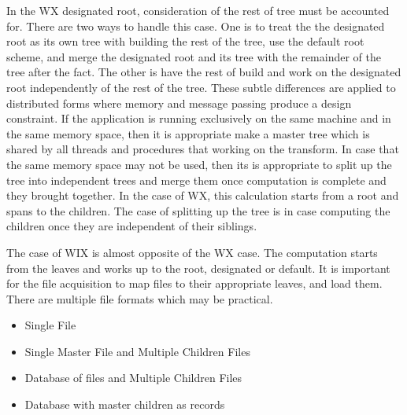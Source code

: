\documentclass[11pt]{article}
\begin{document}
In the WX designated root, consideration of the rest of tree must be accounted for.  There are two ways to handle this case.  One is to treat the the designated root as its own tree with building the rest of the tree, use the default root scheme, and merge the designated root and its tree with the remainder of the tree after the fact.  The other is have the rest of build and work on the designated root independently of the rest of the tree.   These subtle differences are applied to distributed forms where memory and message passing produce a design constraint.  If the application is running exclusively on the same machine and in the same memory space, then it is appropriate make a master tree which is shared by all threads and procedures that working on the transform.   In case that the same memory space may not be used, then its is appropriate to split up the tree into independent trees and merge them once computation is complete and they brought together.    In the case of WX, this calculation starts from a root and spans to the children.  The case of splitting up the tree is in case computing the children once they are independent of their siblings.  

The case of WIX is almost opposite of the WX case.  The computation starts from the leaves and works up to the root, designated or default.  It is important for the file acquisition to map files to their appropriate leaves, and load them.  There are multiple file formats which may be practical.  

\begin{itemize}
\item Single File
\item Single Master File and Multiple Children Files
\item Database of files and Multiple Children Files
\item Database with master children as records
\end{itemize}



 
\end{document}
